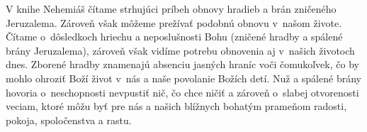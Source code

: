 








V knihe Nehemiáš čítame strhujúci príbeh obnovy hradieb a brán zničeného Jeruzalema. Zároveň však môžeme prežívať podobnú obnovu v~našom živote. Čítame o~dôsledkoch hriechu a neposlušnosti Bohu (zničené hradby a spálené brány Jeruzalema), zároveň však vidíme potrebu obnovenia aj v~našich životoch dnes. Zborené hradby znamenajú absenciu jasných hraníc voči čomukoľvek, čo by mohlo ohroziť Boží život v~nás a naše povolanie Božích detí. Nuž a spálené brány hovoria o~neschopnosti nevpustiť nič, čo chce ničiť a zároveň o~slabej otvorenosti veciam, ktoré môžu byť pre nás a našich blížnych bohatým prameňom radosti, pokoja, spoločenstva a rastu.

